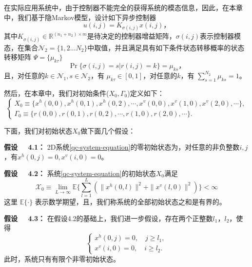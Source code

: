 	在实际应用系统中，由于控制器不能完全的获得系统的模态信息，因此，在本章中，我们基于隐Markov模型，设计如下异步控制器
	\begin{equation}\label{qc-controller}
	u(i,j) = K_{\sigma(i,j)}x(i,j)，
	\end{equation}
	其中$K_{\sigma(i,j)}\in \mathbb{R}^{(n_1+n_2)\times m}$是待决定的控制器增益矩阵，$\sigma(i,j)$表示控制器模态，在集合$\mathcal{N}_{2} = \{1,2...N_{2}\}$中取值，并且满足具有如下条件状态转移概率的状态转移矩阵 $\varPsi=\{\mu_{k\tau }\}$
	\begin{equation}
	\Pr\{\sigma(i,j)=s|r(i,j)=k\}=\mu_{ks }， %
	\end{equation}
	且，对任意的$k\in\mathcal{N}_{1}, s\in\mathcal{N}_{2}$，有 $\mu_{k\tau }\in[0,1]$，对任意的$k$，有  $\sum_{s =1}^{N_{2}}\mu_{ks } = 1$。
	
	然后，在本章中，我们对初始条件($X_{0},\varGamma_{0}$)定义如下：
	\begin{equation*}
		\left\{
			\begin{array}{lr}
				X_{0}\equiv \big\{x^{h}(0,0),x^{h}(0,1),x^{h}(0,2),\cdots, x^{v}(0,0),x^{v}(1,0),x^{v}(2,0),\cdots  \big\},\\
				\varGamma_{0}\equiv \big\{r(0,0), r(0,1),r(0,2),\cdots,r(1,0),r(2,0),\cdots \big\}.
			\end{array}
		\right.
	\end{equation*}
	
	下面，我们对初始状态$X_{0}$做下面几个假设：
	
	{\bf 假设 \ \ 4.1：}
	2D系统\eqref{qc-system-equation}的零初始状态为，对任意的非负整数$i,j$，有$x^{h}(0,j) =0, x^{v}(i,0)=0$。
	
	{\bf 假设 \ \ 4.2：}
	系统\eqref{qc-system-equation}的初始状态$X_{0}$满足
	\begin{equation}
	\mathscr{X}_{0} \equiv \lim\limits_{L\to\infty}\mathbb{E}\Big\{\sum_{l=1}^{L}(\|x^{h}(0,l)\|^{2}+ \|x^{v}(l,0)\|^{2})\Big\} < \infty
	\end{equation}
	这里 $\mathbb{E}\{\cdot\}$ 表示数学期望，且，我们称系统的全部初始状态之和是有界的。
	
	{\bf 假设 \ \ 4.3：}
	在假设4.2的基础上，我们进一步假设，存在两个正整数$l_1$，$l_2$，使得
	\begin{equation}
		\left\{
		\begin{array}{lr}
		x^{h}(0,j)=0,\quad j\geq l_1,\\
		x^{v}(i,0)=0,\quad i\geq l_2.
		\end{array}
		\right.
	\end{equation}
	此时，系统只有有限个非零初始状态。
	
